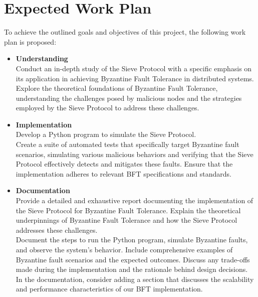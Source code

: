 \documentclass[24pt]{report}
\begin{document}
\section*{Expected Work Plan}
To achieve the outlined goals and objectives of this project, the following work plan is proposed:
\begin{itemize}
    \item \textbf{Understanding} \\
    Conduct an in-depth study of the Sieve Protocol with a specific emphasis on its application in achieving Byzantine Fault Tolerance in distributed systems. Explore the theoretical foundations of Byzantine Fault Tolerance, understanding the challenges posed by malicious nodes and the strategies employed by the Sieve Protocol to address these challenges. 
    
    \item \textbf{Implementation} \\
    Develop a Python program to simulate the Sieve Protocol. \\
    Create a suite of automated tests that specifically target Byzantine fault scenarios, simulating various malicious behaviors and verifying that the Sieve Protocol effectively detects and mitigates these faults. Ensure that the implementation adheres to relevant BFT specifications and standards.

    \item \textbf{Documentation} \\
    Provide a detailed and exhaustive report documenting the implementation of the Sieve Protocol for Byzantine Fault Tolerance. Explain the theoretical underpinnings of Byzantine Fault Tolerance and how the Sieve Protocol addresses these challenges. \\
    Document the steps to run the Python program, simulate Byzantine faults, and observe the system's behavior. Include comprehensive examples of Byzantine fault scenarios and the expected outcomes. Discuss any trade-offs made during the implementation and the rationale behind design decisions. \\
    In the documentation, consider adding a section that discusses the scalability and performance characteristics of our BFT implementation.
\end{itemize}

\newpage



\end{document}
